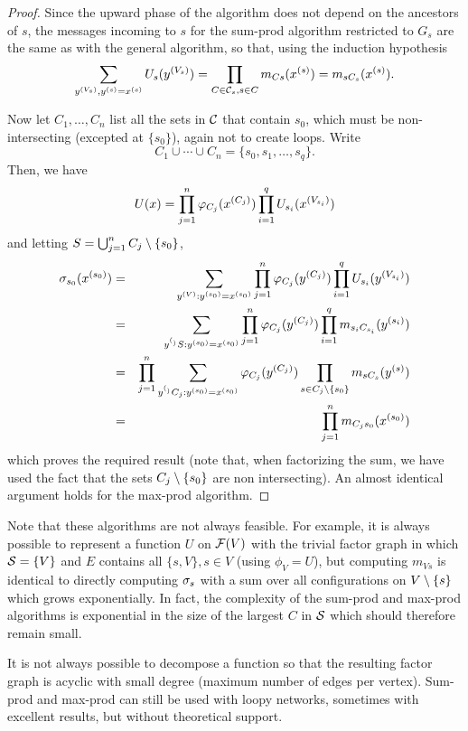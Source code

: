 \begin{proof}
Since the upward phase
of the algorithm does not depend on the ancestors of $s$, the messages
incoming to $s$ for the sum-prod algorithm restricted to $G_s$ are the
same as with the general algorithm, so that, using the
induction hypothesis 
\[
\sum_{y^{(V_s)}, y^{(s)}=x^{(s)}} U_s(y^{(V_s)}) = \prod_{C\in {\mathcal C}_s, s\in C}
m_{Cs}(x^{(s)}) = m_{sC_s}(x^{(s)}).
\]

Now let $C_1, \ldots, C_n$ list all the sets in ${\mathcal C}$ that contain $s_0$,
which must be non-intersecting (excepted at $\{s_0\}$), again not to
create loops. Write
\[
C_1 \cup \cdots \cup C_n = \{s_0, s_1, \ldots, s_q\}.
\]
 Then, we
have
\[
U(x) = \prod_{j=1}^n \varphi_{C_j}(x^{(C_j)}) \prod_{i=1}^qU_{s_i}(x^{(V_{s_i})})
\]
and letting $S = \bigcup_{j=1}^n C_j\setminus \{s_0\}$, 
\begin{eqnarray*}
\sigma_{s_0}(x^{(s_0)}) &=& \sum_{y^{(V)}: y^{(s_0)}= x^{(s_0)}} \prod_{j=1}^n \varphi_{C_j}(y^{(C_j)})
\prod_{i=1}^q U_{s_i}(y^{(V_{s_i})})\\
&=& \sum_{y^{(_)}S: y^{(s_0)}= x^{(s_0)}} \prod_{j=1}^n \varphi_{C_j}(y^{(C_j)})
\prod_{i=1}^q m_{s_iC_{s_i}}(y^{(s_i)})\\
&=& \prod_{j=1}^n \sum_{y^{(_)}{C_j}: y^{(s_0)}=x^{(s_0)}} \varphi_{C_j}(y^{(C_j)})
\prod_{s\in C_j\setminus\{s_0\}} m_{sC_{s}}(y^{(s)})\\
&=& \prod_{j=1}^n  m_{C_js_0}(x^{(s_0)})
\end{eqnarray*}
which proves the required result (note that, when factorizing the sum,
we have used the fact that the sets $C_j\setminus \{s_0\}$ are non
intersecting). An almost identical argument holds for the max-prod
algorithm.
\end{proof}

\begin{remark}
Note that these algorithms are not always feasible. For example, it is
always possible to represent a function $U$ on ${\mathcal F}(V)$ with the
trivial factor graph in which ${\mathcal S}=\{V\}$ and $E$ contains all
$\{s,V\}, s\in V$ (using $\phi_V=U$), but computing $m_{Vs}$ is
identical to directly computing $\sigma_s$ with a sum over all
configurations on $V\setminus\{s\}$ which grows exponentially.
In fact, the complexity of the sum-prod and max-prod algorithms is
exponential in the size of the largest $C$ in ${\mathcal S}$ which should
therefore remain small.
\end{remark}

\begin{remark}
It is not always possible to decompose a function so that the
resulting factor graph is acyclic with small degree (maximum number of
edges per vertex). Sum-prod
and max-prod can still be used with loopy networks, sometimes with excellent
results, but without theoretical support.
\end{remark}

